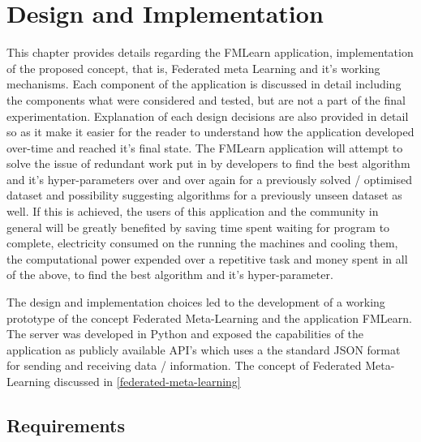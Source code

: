 \chapter{Design and Implementation}

This chapter provides details regarding the FMLearn application, implementation of the proposed concept, that is, Federated meta Learning and it's working mechanisms. Each component of the application is discussed in detail including the components what were considered and tested, but are not a part of the final experimentation. Explanation of each design decisions are also provided in detail so as it make it easier for the reader to understand how the application developed over-time and reached it's final state. The FMLearn application will attempt to solve the issue of redundant work put in by developers to find the best algorithm and it's hyper-parameters over and over again for a previously solved / optimised dataset and possibility suggesting algorithms for a previously unseen dataset as well. If this is achieved, the users of this application and the community in general will be greatly benefited by saving time spent waiting for program to complete, electricity consumed on the running the machines and cooling them, the computational power expended over a repetitive task and money spent in all of the above, to find the best algorithm and it's hyper-parameter.

The design and implementation choices led to the development of a working prototype of the concept Federated Meta-Learning and the application FMLearn. The server was developed in Python and exposed the capabilities of the application as publicly available API's which uses a the standard JSON format for sending and receiving data / information. The concept of Federated Meta-Learning discussed in \ref{federated-meta-learning}

\section{Requirements}

